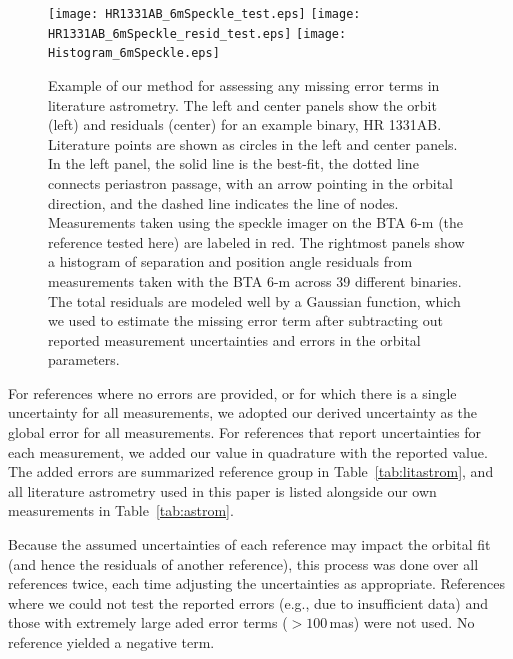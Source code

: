 \documentclass[twocolumn]{aastex62}
\begin{document}
\begin{figure}[ht]
\begin{center}
\texttt{[image: HR1331AB\_6mSpeckle\_test.eps]}
\texttt{[image: HR1331AB\_6mSpeckle\_resid\_test.eps]}
\texttt{[image: Histogram\_6mSpeckle.eps]}
\caption{Example of our method for assessing any missing error terms in literature astrometry. The left and center panels show the orbit (left) and residuals (center) for an example binary, HR 1331AB. Literature points are shown as circles in the left and center panels. In the left panel, the solid line is the best-fit, the dotted line connects periastron passage, with an arrow pointing in the orbital direction, and the dashed line indicates the line of nodes. Measurements taken using the speckle imager on the BTA 6-m (the reference tested here) are labeled in red. The rightmost panels show a histogram of separation and position angle residuals from measurements taken with the BTA 6-m across 39 different binaries. The total residuals are modeled well by a Gaussian function, which we used to estimate the missing error term after subtracting out reported measurement uncertainties and errors in the orbital parameters. }
\label{fig:literr}
\end{center}
\end{figure}

For references where no errors are provided, or for which there is a single uncertainty for all measurements, we adopted our derived uncertainty as the global error for all measurements. For references that report uncertainties for each measurement, we added our value in quadrature with the reported value. The added errors are summarized reference group in Table~\ref{tab:litastrom}, and all literature astrometry used in this paper is listed alongside our own measurements in Table~\ref{tab:astrom}. 

Because the assumed uncertainties of each reference may impact the orbital fit (and hence the residuals of another reference), this process was done over all references twice, each time adjusting the uncertainties as appropriate. References where we could not test the reported errors (e.g., due to insufficient data) and those with extremely large aded error terms ($>100$\,mas) were not used. No reference yielded a negative term. 
\end{document}
